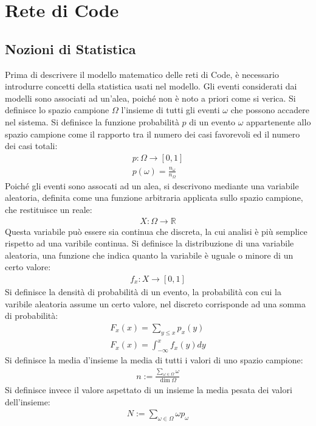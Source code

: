 \documentclass{article}
\numberwithin{equation}{subsection}
\begin{document}
\clearpage

\section{Rete di Code}

\subsection{Nozioni di Statistica}

Prima di descrivere il modello matematico delle reti di Code, è necessario introdurre concetti della statistica usati nel modello. Gli eventi considerati dai modelli sono 
associati ad un'alea, poiché non è noto a priori come si verica. Si definisce lo spazio campione $\Omega$ l'insieme di tutti gli eventi $\omega$ che possono accadere nel 
sistema. Si definisce la funzione probabilità $p$ di un evento $\omega$ appartenente allo spazio campione come il rapporto tra il numero dei casi favorevoli ed il numero dei casi 
totali:
\begin{gather*}
    p:\Omega\to[0,1]\\
    p(\omega)=\displaystyle\frac{n_{\omega}}{n_{\Omega}}
\end{gather*}
Poiché gli eventi sono assocati ad un alea, si descrivono mediante una variabile aleatoria, definita come una funzione arbitraria applicata sullo spazio campione, che 
restituisce un reale:
\begin{gather*}
    X:\Omega\to\mathbb{R}
\end{gather*}
Questa variabile può essere sia continua che discreta, la cui analisi è più semplice rispetto ad una varibile continua. 
Si definisce la distribuzione di una variabile aleatoria, una funzione che indica quanto la variabile è uguale o minore di un certo valore:
\begin{gather*}
    f_x:X\to[0,1]
\end{gather*}
Si definisce la densità di probabilità di un evento, la probabilità con cui la varibile aleatoria assume un certo valore, nel discreto corrisponde ad una somma di probabilità:
\begin{gather*}
    F_x(x)=\displaystyle\sum_{y\leq x}p_x(y)\\
    F_x(x)=\displaystyle\int_{-\infty}^xf_x(y)dy
\end{gather*}
Si definisce la media d'insieme la media di tutti i valori di uno spazio campione:
\begin{gather*}
    n:=\displaystyle\frac{\displaystyle\sum_{\omega\in\Omega}\omega}{\dim\Omega}
\end{gather*}
Si definisce invece il valore aspettato di un insieme la media pesata dei valori dell'insieme:
\begin{gather*}
    N:=\displaystyle\sum_{\omega\in\Omega}\omega p_\omega
\end{gather*}
\end{document}

